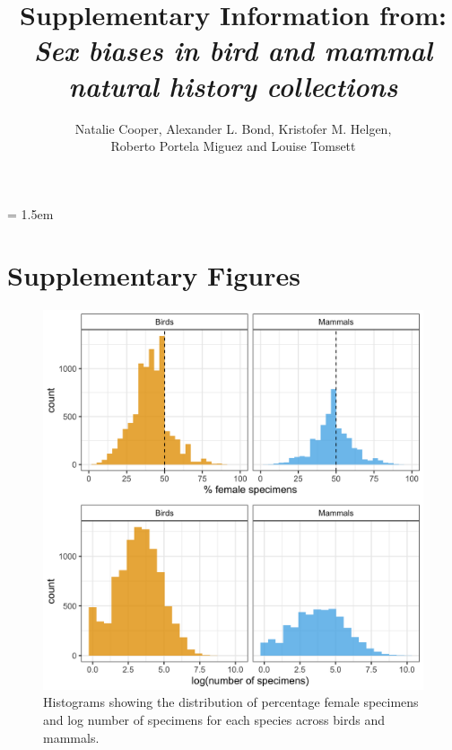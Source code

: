 \documentclass[a4paper, 12pt]{article}
\title{Supplementary Information from: \textit{Sex biases in bird and mammal natural history collections}}
\author{Natalie Cooper, 
  Alexander L. Bond,
  Kristofer M. Helgen,\\
  Roberto Portela Miguez and
  Louise Tomsett}
\date{}
\begin{document}
\maketitle

\parindent = 1.5em
\addtolength{\parskip}{.3em}


\section*{Supplementary Figures} 

\begin{figure}[H]
 \centering
  \includegraphics[width = \linewidth]{figures/histogram-specimen-counts.png}
  \caption{Histograms showing the distribution of percentage female specimens and log number of specimens for each species across birds and mammals.}
  \label{fig-histograms}
\end{figure}
\end{document}
